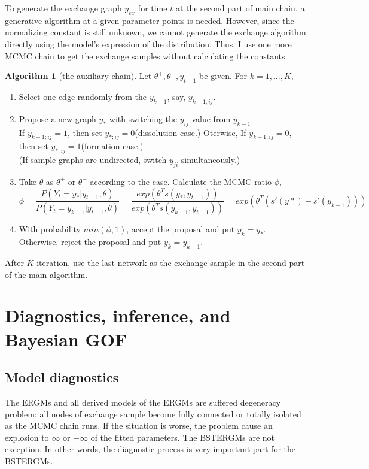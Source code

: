 \documentclass[aspectratio=169,ignorenonframetext,9pt]{beamer}
\theoremstyle{plain}
\theoremstyle{definition}
\newtheorem{algo}{Algorithm}[section]
\begin{document}
To generate the exchange graph $y_{ex}$ for time $t$ at the second part of main chain,
a generative algorithm at a given parameter points is needed.
However, since the normalizing constant is still unknown, we cannot generate the exchange algorithm 
directly using the model's expression of the distribution.
Thus, I use one more MCMC chain to get the exchange samples without calculating the constants.

\begin{algo}[the auxiliary chain]
Let $\theta^+,\theta^-,y_{t-1}$ be given. For $k=1,...,K$,
\begin{enumerate}
    \item Select one edge randomly from the $y_{k-1}$, say, $y_{k-1;ij}$.
    \item Propose a new graph $y_*$ with switching the $y_{ij}$ value from $y_{k-1}$: 
    \\ If $y_{k-1;ij}=1$, then set $y_{*;ij}=0$(dissolution case.) Oterwise, If $y_{k-1;ij}=0$, then set $y_{*;ij}=1$(formation case.)
    \\ (If sample graphs are undirected, switch $y_{ji}$ simultaneously.)
    \item Take $\theta$ as $\theta^+$ or $\theta^-$ according to the case. Calculate the MCMC ratio $\phi$,
    \[\phi = \frac{P(Y_t=y_*|y_{t-1},\theta)}{P(Y_t=y_{k-1}|y_{t-1},\theta)}= \frac{exp(\theta^T s(y_*,y_{t-1}))}{exp(\theta^T s(y_{k-1},y_{t-1}))} = exp(\theta^T (s'(y*)-s'(y_{k-1})))\]
    \item With probability $min(\phi,1)$, accept the proposal and put $y_k=y_*$.\\
        Otherwise, reject the proposal and put $y_k=y_{k-1}$.
\end{enumerate}
\end{algo}
After $K$ iteration, use the last network as the exchange sample in the second part of the main algorithm.


\section{Diagnostics, inference, and Bayesian GOF}



\subsection{Model diagnostics}
The ERGMs and all derived models of the ERGMs are suffered degeneracy problem:
all nodes of exchange sample become fully connected or totally isolated as the MCMC chain runs. 
If the situation is worse, the problem cause an explosion to $\infty$ or $-\infty$ of the fitted parameters.
The BSTERGMs are not exception. In other words, the diagnostic process is very important part for the BSTERGMs.
\end{document}
